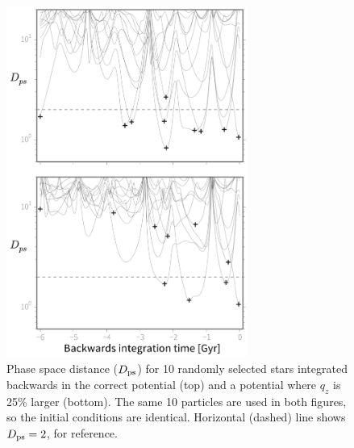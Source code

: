\begin{figure}[hp!]
\begin{center}
\includegraphics[width=0.7\textwidth,trim=5 0 0 0, clip]{figures/ch1/fig3.pdf}
\caption{Phase space distance ($D_{\rm ps}$) for 10 randomly selected stars
integrated backwards in the correct potential (top) and a potential where $q_z$
is 25\% larger (bottom). The same 10 particles are used in both figures, so the
initial conditions are identical. Horizontal (dashed) line shows $D_{\rm ps}=2$,
for reference.}
\label{fig:ps_distance}
\end{center}
\end{figure}

